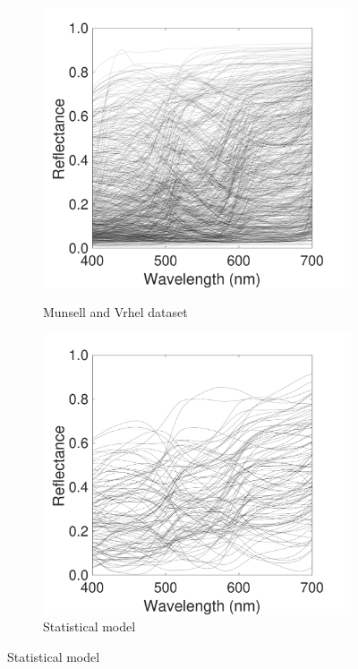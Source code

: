 \documentclass{jov}
\begin{document}
\begin{figure}
\centering
	\begin{subfigure}{0.24 \textwidth}
    \centering
            \caption{Munsell and Vrhel dataset}
        \includegraphics[width=\textwidth]{../FiguresDraft5/Figure7/Figure7_a.pdf}
        \label{fig:reflectanceSpectra}
    \end{subfigure}
    \begin{subfigure}{0.24 \textwidth}
    \centering
        \caption{Statistical model}
        \includegraphics[width=\textwidth]{../FiguresDraft5/Figure7/Figure7_b.pdf}

\end{subfigure}
\end{figure}
\end{document}
